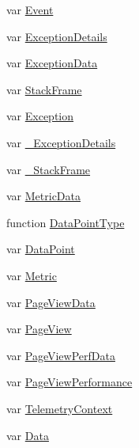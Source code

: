 \begin{DoxyCompactItemize}
\item 
var \hyperlink{_scripts_2ai_80_822_89-build00167_8js_aed01caf943a868f8e12e0420da8fa542}{Event}
\item 
var \hyperlink{_scripts_2ai_80_822_89-build00167_8js_a7f7a19d048e084f626f1c757d98f10a2}{Exception\+Details}
\item 
var \hyperlink{_scripts_2ai_80_822_89-build00167_8js_ad9d17c4a3d7a2a475f6059d400fa1671}{Exception\+Data}
\item 
var \hyperlink{_scripts_2ai_80_822_89-build00167_8js_afa75643fbcc744bd76f3e6c5aa7df205}{Stack\+Frame}
\item 
var \hyperlink{_scripts_2ai_80_822_89-build00167_8js_af06a8af2cf9b85ae807943ea94306514}{Exception}
\item 
var \hyperlink{_scripts_2ai_80_822_89-build00167_8js_aadbde9e3300de31fb74960be10152488}{\+\_\+\+Exception\+Details}
\item 
var \hyperlink{_scripts_2ai_80_822_89-build00167_8js_a5929f1dacfa37e45fcd288d6a2cde2e6}{\+\_\+\+Stack\+Frame}
\item 
var \hyperlink{_scripts_2ai_80_822_89-build00167_8js_a2dc65d060c9e53677015ff1e51b99976}{Metric\+Data}
\item 
function \hyperlink{_scripts_2ai_80_822_89-build00167_8js_aa093c6c94aa5d7f88d2106cf69c9d985}{Data\+Point\+Type}
\item 
var \hyperlink{_scripts_2ai_80_822_89-build00167_8js_a34dc550ccc7152685306095af9b3963e}{Data\+Point}
\item 
var \hyperlink{_scripts_2ai_80_822_89-build00167_8js_ac489226418fc3fc53d1daf8e6636b97d}{Metric}
\item 
var \hyperlink{_scripts_2ai_80_822_89-build00167_8js_ac6cfe0b215811b1151dc8243d8c9d792}{Page\+View\+Data}
\item 
var \hyperlink{_scripts_2ai_80_822_89-build00167_8js_af1b38c443d0ea4ca3319b382ffb5f515}{Page\+View}
\item 
var \hyperlink{_scripts_2ai_80_822_89-build00167_8js_ae0635d96ed177bb9d2eebff04a41750e}{Page\+View\+Perf\+Data}
\item 
var \hyperlink{_scripts_2ai_80_822_89-build00167_8js_a54e662eeb199e47ffb9a94a1e1373983}{Page\+View\+Performance}
\item 
var \hyperlink{_scripts_2ai_80_822_89-build00167_8js_a8523f5dff8fbe51aa4985c4f2be9d428}{Telemetry\+Context}
\item 
var \hyperlink{_scripts_2ai_80_822_89-build00167_8js_a1c70ddbfa3627868ac58860850b66e52}{Data}
\item 

\end{DoxyCompactItemize}

